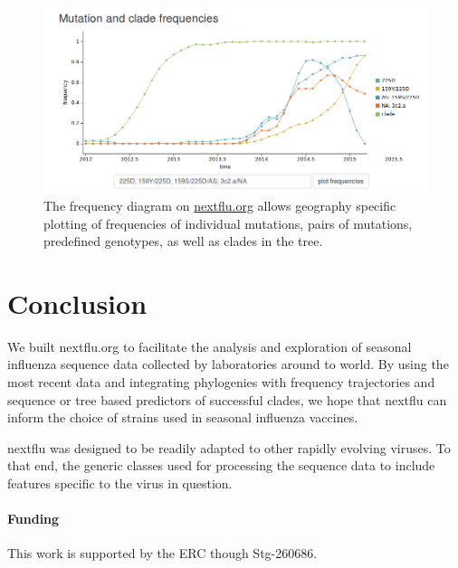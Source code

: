 \documentclass{bioinfo}
\begin{document}
\begin{figure}[bhtp]
	\begin{center}
	\includegraphics[width=0.99\columnwidth]{figures/frequencies}
\caption[]{The frequency diagram on \url{nextflu.org} allows geography specific
		plotting of frequencies of individual mutations, pairs of mutations, 
		predefined genotypes, as well as clades in the tree. }
\label{fig:freq}
\end{center}
\end{figure}

\section{Conclusion}
We built nextflu.org to facilitate the analysis and exploration of seasonal influenza sequence data collected by laboratories around to world.
By using the most recent data and integrating phylogenies with frequency trajectories and sequence or tree based predictors of successful clades, we hope that nextflu can inform the choice of strains used in seasonal influenza vaccines. 

nextflu was designed to be readily adapted to other rapidly evolving viruses. To that end, the generic classes used for processing the sequence data to include features specific to the virus in question. 

\paragraph{Funding\textcolon}This work is supported by the ERC though Stg-260686.


\end{document}
